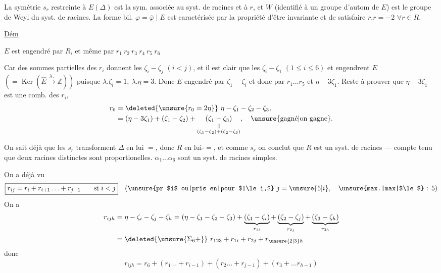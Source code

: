  La symétrie $s_r$ restreinte à $E(\Delta)$ est la sym. associée au syst. de racines et à $r$, et $W$ (identifié à un groupe d'autom de $E$) est  le groupe de Weyl du syst. de racines. La forme bil.  $\varphi=\overline\varphi\mid E$ est caractérisée par la propriété d'être invariante  et de satisfaire $r.r=-2$ $\forall r\in R$.

\uline{Dém} 

$E$ est engendré par $R$, et même par $r_1\ r_2\ r_3\ r_4\ r_5\ r_6$

Car des sommes partielles des $r_i$  donnent les $\zeta_{i}-\zeta_j$ $(i<j)$, et il est clair que les $\zeta_i-\zeta_1$ $(1\le i\le6)$ et   engendrent $E$ $(=\operatorname{Ker}(\widehat E\xrightarrow{\lambda\, .}\mathbb Z))$ puisque  $\lambda.\zeta_i=1,\ \lambda.\eta=3$. Donc $E$ engendré
par  $\zeta_1-\zeta_i$ et  
\deleted{\unsure{$= \lambda+\eta$|$3\lambda-\eta$}} donc par $r_1\ldots r_5$ et $\eta-3\zeta_1$. Reste à prouver que $\eta-3\zeta_1$ est une comb. des $r_i$, 
\[
\begin{aligned}
r_6&=\deleted{\unsure{r_0=2\eta}}\ \eta-\zeta_1-\zeta_2-\zeta_3,\\
&=(\eta-3\zeta_1)+(\zeta_1-\zeta_2)+
\underset{\substack{\Vert\\(\zeta_1-\zeta_2)+(\zeta_2-\zeta_3)}}{(\zeta_1-\zeta_3)},\quad\text{\unsure{gagné|on gagne}.}
\end{aligned}
\]

On sait déjà que les $s_r$ transforment $\Delta$ en lui $=$, donc $R$ en lui-$=$, et comme $s_r$  on conclut que $R$ est un syst. de racines --- compte tenu que deux racines distinctes  sont  proportionelles.   $\alpha_1\ldots\alpha_6$ sont un syst. de racines simples. 

On a déjà vu
\[
\boxed{r_{ij}=r_i+r_{i+1}\ldots+r_{j-1}\qquad\text{si }i<j}
\quad\text{(\unsure{pr $i$ ou|pris en|pour $1\le i,$} }j=\unsure{5|i},\quad\text{\unsure{max.|max|$\le$} : }5\text{)}
\]
On a
\[
\begin{aligned}
r_{ijh}&=\eta-\zeta_i-\zeta_j-\zeta_h=(\eta-\zeta_1-\zeta_2-\zeta_3)
+\underbrace{(\zeta_1-\zeta_i)}_{r_{1i}}+\underbrace{(\zeta_2-\zeta_j)}_{r_{2j}}+\underbrace{(\zeta_3-\zeta_h)}_{r_{3h}}\\
&=\deleted{\unsure{\Sigma_6+}}\ r_{123}+r_{1i}+r_{2j}+r_{\unsure{2|3}h}
\end{aligned}
\]
donc
\[
r_{ijh}=r_6+(r_1\ldots+r_{i-1})+(r_2\ldots+r_{j-1})+(r_3+\ldots r_{h-1})
\]

